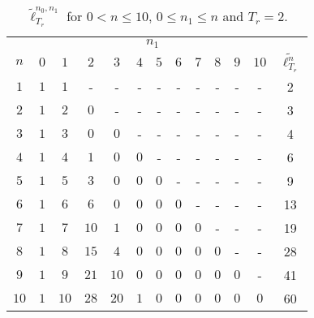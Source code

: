 \documentclass{article}
\begin{document}
    \begin{table}[!ht]
      \centering
      \begin{tabular}{*{13}{c}}
        \toprule
        & \multicolumn{11}{c}{$n_1$} & \\
        $n$ & $0$ & $1$ & $2$ & $3$ & $4$ & $5$ & $6$ & $7$ & $8$ & $9$ & $10$ & $\tilde{\ell^n_{T_r}}$\\
        \midrule
        $1$ & $1$ & $1$ & - & - & - & - & - & - & - & - & - & 2 \\
        $2$ & $1$ & $2$ & $0$ & - & - & - & - & - & - & - & - & 3 \\
        $3$ & $1$ & $3$ & $0$ & $0$ & - & - & - & - & - & - & - & 4 \\
        $4$ & $1$ & $4$ & $1$ & $0$ & $0$ & - & - & - & - & - & - & 6 \\
        $5$ & $1$ & $5$ & $3$ & $0$ & $0$ & $0$ & - & - & - & - & - & 9 \\
        $6$ & $1$ & $6$ & $6$ & $0$ & $0$ & $0$ & $0$ & - & - & - & - & 13 \\
        $7$ & $1$ & $7$ & $10$ & $1$ & $0$ & $0$ & $0$ & $0$ & - & - & - & 19 \\
        $8$ & $1$ & $8$ & $15$ & $4$ & $0$ & $0$ & $0$ & $0$ & $0$ & - & - & 28 \\
        $9$ & $1$ & $9$ & $21$ & $10$ & $0$ & $0$ & $0$ & $0$ & $0$ & $0$ & - & 41 \\
        $10$ & $1$ & $10$ & $28$ & $20$ & $1$ & $0$ & $0$ & $0$ & $0$ & $0$ & $0$ & 60 \\
        \bottomrule
      \end{tabular}
      \caption{$\tilde{\ell}_{T_r}^{n_0,n_1}$ for $0 < n \leq 10$, $0 \leq n_1 \leq n$ and $T_r = 2$.}
      \label{tab:aperiodic_two_spike}
    \end{table}
\end{document}
